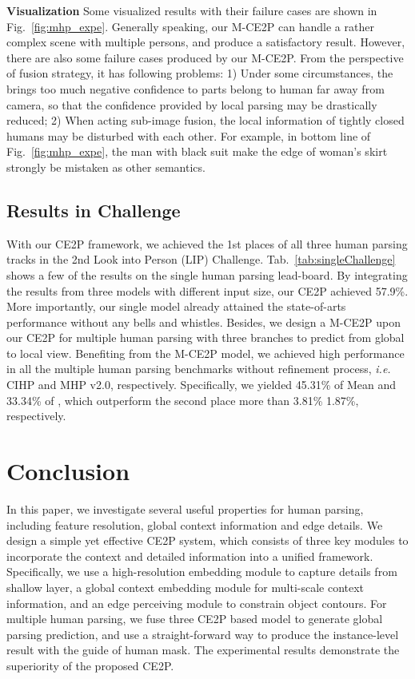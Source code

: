 \documentclass[letterpaper]{article} \usepackage{formatting-instructions-latex-2019}  \usepackage{times}  \usepackage{helvet}  \usepackage{courier}  \usepackage{url}  \usepackage{graphicx}  \frenchspacing  \setlength{\pdfpagewidth}{8.5in}  \setlength{\pdfpageheight}{11in}
\newcommand{\ie}{\emph{i.e. }}
\begin{document}
\noindent \textbf{Visualization}
Some visualized results with their failure cases are shown in Fig.~\ref{fig:mhp_expe}. Generally speaking, our M-CE2P can handle a rather complex scene with multiple persons, and produce a satisfactory result. However, there are also some failure cases produced by our M-CE2P. From the perspective of fusion strategy, it has following problems: 1) Under some circumstances, the  brings too much negative confidence to parts belong to human far away from camera, so that the confidence provided by local parsing may be drastically reduced; 2) When acting sub-image fusion, the local information of tightly closed humans may be disturbed with each other. For example, in bottom line of Fig.~\ref{fig:mhp_expe}, the man with black suit make the edge of woman's skirt strongly be mistaken as other semantics.




\subsection{Results in Challenge}

With our CE2P framework, we achieved the 1st places of all three human parsing tracks in the 2nd Look into Person (LIP) Challenge. Tab.~\ref{tab:singleChallenge} shows a few of the results on the single human parsing lead-board. By integrating the results from three models with different input size, our CE2P achieved 57.9\%. More importantly, our single model already attained the state-of-arts performance without any bells and whistles. Besides, we design a M-CE2P upon our CE2P for multiple human parsing with three branches to predict from global to local view. Benefiting from the M-CE2P model, we achieved high performance in all the multiple human parsing benchmarks without refinement process, \ie CIHP and MHP v2.0, respectively. Specifically, we yielded 45.31\% of Mean  and 33.34\% of , which outperform the second place more than 3.81\% 1.87\%, respectively.  

\section{Conclusion}

In this paper, we investigate several useful properties for human parsing, including feature resolution, global context information and edge details. We design a simple yet effective CE2P system, which consists of three key modules to incorporate the context and detailed information into a unified framework. Specifically, we use a high-resolution embedding module to capture details from shallow layer, a global context embedding module for multi-scale context information, and an edge perceiving module to constrain object contours. For multiple human parsing, we fuse three CE2P based model to generate global parsing prediction, and use a straight-forward way to produce the instance-level result with the guide of human mask. The experimental results demonstrate the superiority of the proposed CE2P.
\end{document}
